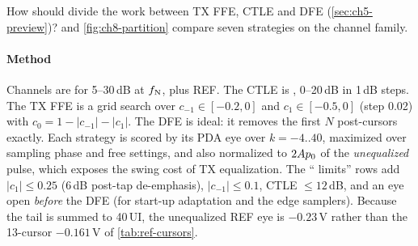 How should \OS{} divide the work between TX FFE, CTLE and DFE (\cref{sec:ch5-preview})?  and \cref{fig:ch8-partition} compare seven strategies on the  channel family.

\paragraph{Method} Channels are  for 5--30\,dB at $f_\mathrm{N}$, plus REF. The CTLE is , 0--20\,dB in 1\,dB steps. The TX FFE is a grid search over $c_{-1}\in[-0.2,0]$ and $c_1\in[-0.5,0]$ (step 0.02) with $c_0=1-\lvert c_{-1}\rvert-\lvert c_1\rvert$. The DFE is ideal: it removes the first $N$ post-cursors exactly. Each strategy is scored by its PDA eye over $k=-4..40$, maximized over sampling phase and free settings, and also normalized to $2Ap_{0}$ of the \emph{unequalized} pulse, which exposes the swing cost of TX equalization. The ``\OS{} limits'' rows add $\lvert c_1\rvert\le0.25$ (6\,dB post-tap de-emphasis), $\lvert c_{-1}\rvert\le0.1$, CTLE $\le12$\,dB, and an eye open \emph{before} the DFE (for start-up adaptation and the edge samplers). Because the tail is summed to 40\,UI, the unequalized REF eye is $-0.23$\,V rather than the 13-cursor $-0.161$\,V of \cref{tab:ref-cursors}.

